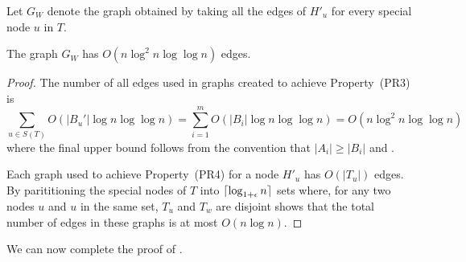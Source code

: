 \documentclass{patmorin}
\begin{document}
Let $G_W$ denote the graph obtained by taking all the edges of $H'_u$
for every special node $u$ in $T$.

\begin{clm}
  The graph $G_W$ has $O(n\log^2 n\log\log n)$ edges.
\end{clm}

\begin{proof}
  The number of all edges used in graphs created to achieve Property~(PR3) is
  \[
      \sum_{u\in S(T)}O(|B_u'|\log n\log\log n)
      = \sum_{i=1}^m O(|B_i|\log n\log\log n)
      = O(n\log^2 n\log\log n)
  \]
  where the final upper bound follows from the convention that $|A_i|\ge
  |B_i|$ and .

  Each graph used to achieve Property~(PR4) for a node $H'_u$ has
  $O(|T_u|)$ edges.  By parititioning the special nodes of $T$ into
  ${\lceil \log_{1+\epsilon} n \rceil}$ sets where, for any two nodes $u$ and $u$
  in the same set, $T_u$ and $T_{w}$ are disjoint shows that the total
  number of edges in these graphs is at most $O(n\log n)$.
\end{proof}

%
%

We can now complete the proof of .
\end{document}

